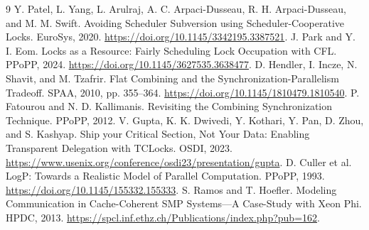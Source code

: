 \documentclass[10pt,twocolumn]{article}
\begin{document}
\begin{thebibliography}{9}
 Y. Patel, L. Yang, L. Arulraj, A. C. Arpaci-Dusseau,
R. H. Arpaci-Dusseau, and M. M. Swift. Avoiding Scheduler Subversion using
Scheduler-Cooperative Locks. EuroSys, 2020.
\url{https://doi.org/10.1145/3342195.3387521}.
 J. Park and Y. I. Eom. Locks as a Resource: Fairly Scheduling
Lock Occupation with CFL. PPoPP, 2024.
\url{https://doi.org/10.1145/3627535.3638477}.
 D. Hendler, I. Incze, N. Shavit, and M. Tzafrir. Flat Combining
and the Synchronization-Parallelism Tradeoff. SPAA, 2010, pp. 355--364.
\url{https://doi.org/10.1145/1810479.1810540}.
 P. Fatourou and N. D. Kallimanis. Revisiting the Combining
Synchronization Technique. PPoPP, 2012.
 V. Gupta, K. K. Dwivedi, Y. Kothari, Y. Pan, D. Zhou, and
S. Kashyap. Ship your Critical Section, Not Your Data: Enabling Transparent
Delegation with TCLocks. OSDI, 2023.
\url{https://www.usenix.org/conference/osdi23/presentation/gupta}.
 D. Culler et al. LogP: Towards a Realistic Model of Parallel
Computation. PPoPP, 1993. \url{https://doi.org/10.1145/155332.155333}.
 S. Ramos and T. Hoefler. Modeling Communication in
Cache-Coherent SMP Systems---A Case-Study with Xeon Phi. HPDC, 2013.
\url{https://spcl.inf.ethz.ch/Publications/index.php?pub=162}.
\end{thebibliography}

\clearpage
\nobalance
\appendix

\end{document}
